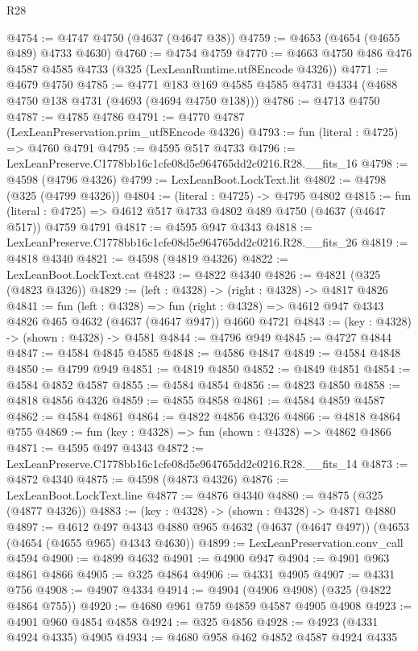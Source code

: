 \begin{lexlean}{R28}
\begin{coremodule}
@4754 := @4747 @4750 (@4637 (@4647 @38))
@4759 := @4653 (@4654 (@4655 @489) @4733 @4630)
@4760 := @4754 @4759
@4770 := @4663 @4750 @486 @476 @4587 @4585 @4733 (@325 (LexLeanRuntime.utf8Encode @4326))
@4771 := @4679 @4750
@4785 := @4771 @183 @169 @4585 @4585 @4731 @4334 (@4688 @4750 @138 @4731 (@4693 (@4694 @4750 @138)))
@4786 := @4713 @4750
@4787 := @4785 @4786
@4791 := @4770 @4787 (LexLeanPreservation.prim_utf8Encode @4326)
@4793 := fun (literal : @4725) => @4760 @4791
@4795 := @4595 @517 @4733
@4796 := LexLeanPreserve.C1778bb16c1cfe08d5e964765dd2c0216.R28.__fits_16
@4798 := @4598 (@4796 @4326)
@4799 := LexLeanBoot.LockText.lit
@4802 := @4798 (@325 (@4799 @4326))
@4804 := (literal : @4725) -> @4795 @4802
@4815 := fun (literal : @4725) => @4612 @517 @4733 @4802 @489 @4750 (@4637 (@4647 @517)) @4759 @4791
@4817 := @4595 @947 @4343
@4818 := LexLeanPreserve.C1778bb16c1cfe08d5e964765dd2c0216.R28.__fits_26
@4819 := @4818 @4340
@4821 := @4598 (@4819 @4326)
@4822 := LexLeanBoot.LockText.cat
@4823 := @4822 @4340
@4826 := @4821 (@325 (@4823 @4326))
@4829 := (left : @4328) -> (right : @4328) -> @4817 @4826
@4841 := fun (left : @4328) =>
  fun (right : @4328) => @4612 @947 @4343 @4826 @465 @4632 (@4637 (@4647 @947)) @4660 @4721
@4843 := (key : @4328) -> (shown : @4328) -> @4581
@4844 := @4796 @949
@4845 := @4727 @4844
@4847 := @4584 @4845 @4585
@4848 := @4586 @4847
@4849 := @4584 @4848
@4850 := @4799 @949
@4851 := @4819 @4850
@4852 := @4849 @4851
@4854 := @4584 @4852 @4587
@4855 := @4584 @4854
@4856 := @4823 @4850
@4858 := @4818 @4856 @4326
@4859 := @4855 @4858
@4861 := @4584 @4859 @4587
@4862 := @4584 @4861
@4864 := @4822 @4856 @4326
@4866 := @4818 @4864 @755
@4869 := fun (key : @4328) => fun (shown : @4328) => @4862 @4866
@4871 := @4595 @497 @4343
@4872 := LexLeanPreserve.C1778bb16c1cfe08d5e964765dd2c0216.R28.__fits_14
@4873 := @4872 @4340
@4875 := @4598 (@4873 @4326)
@4876 := LexLeanBoot.LockText.line
@4877 := @4876 @4340
@4880 := @4875 (@325 (@4877 @4326))
@4883 := (key : @4328) -> (shown : @4328) -> @4871 @4880
@4897 := @4612
    @497
    @4343
    @4880
    @965
    @4632
    (@4637 (@4647 @497))
    (@4653 (@4654 (@4655 @965) @4343 @4630))
@4899 := LexLeanPreservation.conv_call @4594
@4900 := @4899 @4632
@4901 := @4900 @947
@4904 := @4901 @963 @4861 @4866
@4905 := @325 @4864
@4906 := @4331 @4905
@4907 := @4331 @756
@4908 := @4907 @4334
@4914 := @4904 (@4906 @4908) (@325 (@4822 @4864 @755))
@4920 := @4680 @961 @759 @4859 @4587 @4905 @4908
@4923 := @4901 @960 @4854 @4858
@4924 := @325 @4856
@4928 := @4923 (@4331 @4924 @4335) @4905
@4934 := @4680 @958 @462 @4852 @4587 @4924 @4335

\end{coremodule}
\end{lexlean}
